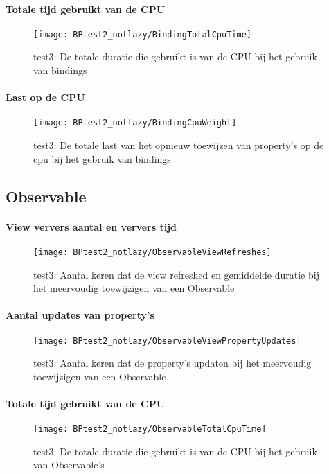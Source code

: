 \paragraph{Totale tijd gebruikt van de CPU}
\begin{figure}[H]
    \centering
    \texttt{[image: BPtest2\_notlazy/BindingTotalCpuTime]} 
    \caption{test3: De totale duratie die gebruikt is van de CPU bij het gebruik van bindings}
    \label{fig:cpuUsageTimeBinding3}
\end{figure}
\paragraph{Last op de CPU}
\begin{figure}[H]
    \centering
    \texttt{[image: BPtest2\_notlazy/BindingCpuWeight]} 
    \caption{test3: De totale last van het opnieuw toewijzen van property's op de cpu bij het gebruik van bindings}
    \label{fig:cpuWeightBinding3}
\end{figure}

\subsection{Observable}
\paragraph{View ververs aantal en ververs tijd}
\begin{figure}[H]
    \centering
    \texttt{[image: BPtest2\_notlazy/ObservableViewRefreshes]} 
    \caption{test3: Aantal keren dat de view refreshed en gemiddelde duratie bij het meervoudig toewijzigen van een Observable}
    \label{fig:viewRefreshesObservable3}
\end{figure}
\paragraph{Aantal updates van property's}
\begin{figure}[H]
    \centering
    \texttt{[image: BPtest2\_notlazy/ObservableViewPropertyUpdates]} 
    \caption{test3: Aantal keren dat de property's updaten bij het meervoudig toewijzigen van een Observable}
    \label{fig:propertyUpdatesObservable3}
\end{figure}
\paragraph{Totale tijd gebruikt van de CPU}
\begin{figure}[H]
    \centering
    \texttt{[image: BPtest2\_notlazy/ObservableTotalCpuTime]} 
    \caption{test3: De totale duratie die gebruikt is van de CPU bij het gebruik van Observable's}
    \label{fig:cpuUsageTimeObservable3}
\end{figure}

